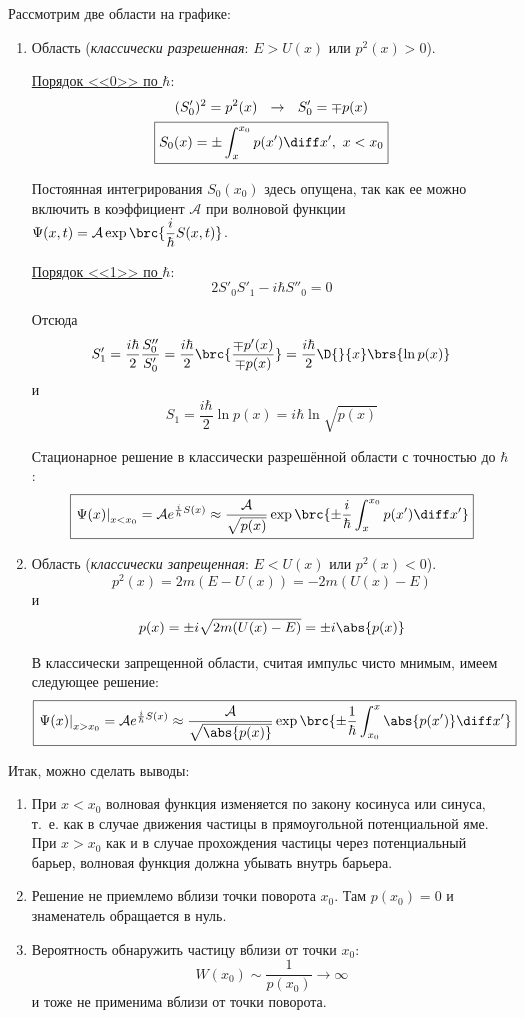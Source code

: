 Рассмотрим две области на графике:
\renewcommand{\labelenumi}{(\alph{enumi})}
\begin{enumerate}
\item Область  ({\em классически разрешенная}: $E > U(x)$ или $p^2(x)>0$).

\underline{Порядок <<0>> по $\hbar$}:
$$
\begin{gathered}
(S'_0)^2 = p^2(x) ~~ \rightarrow~~ S'_0 = \mp p(x)\\
\boxed{S_0(x) = \pm \int_x^{x_0} p(x')\diff x',~ x<x_0}
\end{gathered}
$$

Постоянная интегрирования $S_0(x_0)$ здесь опущена, так как ее можно включить в коэффициент $\mathcal{A}$ при волновой функции ${\Psi(x, t) = \mathcal{A} \exp \brc{\dfrac{i}{\hbar} S(x, t)}}$.

\underline{Порядок <<1>> по $\hbar$}:
$$
2 S'_0 S'_1 - i\hbar S''_0 = 0
$$

Отсюда
$$
S'_1 = \frac{i\hbar}{2} \frac{S''_0}{S'_0} = \frac{i\hbar}{2} \brc{\frac{\mp p'(x)}{\mp p(x)}} = \frac{i\hbar}{2} \D{}{x}\brs{\ln p(x)}
$$
и
$$
S_1 = \frac{i\hbar}{2} \ln p(x) = \boxed{i\hbar \ln \sqrt{p(x)}}
$$

Стационарное решение в классически разрешённой области с точностью до $\hbar$:
$$
\boxed{\left. \Psi(x) \right|_{x<x_0} = \mathcal{A} e^{\frac{i}{h} S(x)} \approx \frac{\mathcal{A}}{\sqrt{p(x)}} \exp \brc{\pm\frac{i}{\hbar}\int_x^{x_0} p(x') \diff x'} }
$$

\item Область  ({\em классически запрещенная}: $E<U(x)$ или $p^2(x)<0$).
$$
p^2(x) = 2m(E-U(x)) = -2m(U(x)-E)
$$
и
$$
p(x) = \pm i \sqrt{2m(U(x)-E)} = \pm i \abs{p(x)}
$$

В классически запрещенной области, считая импульс чисто мнимым, имеем следующее решение:
$$
\boxed{\left. \Psi(x) \right|_{x>x_0} = \mathcal{A} e^{\frac{i}{\hbar} S(x)} \approx \frac{\mathcal{A}}{\sqrt{\abs{p(x)}}} \exp \brc{\pm\frac{1}{\hbar}\int_{x_0}^{x} \abs{p(x')} \diff x'} }
$$
\end{enumerate}

Итак, можно сделать выводы:
\renewcommand{\labelenumi}{\arabic{enumi})}
\begin{enumerate}
\item При $x<x_0$ волновая функция изменяется по закону косинуса или синуса, т.~е. как в случае движения частицы в прямоугольной потенциальной яме. При $x>x_0$ как и в случае прохождения частицы через потенциальный барьер, волновая функция должна убывать внутрь барьера.
\item Решение не приемлемо вблизи точки поворота $x_0$. Там $p(x_0) = 0$ и знаменатель обращается в нуль.
\item Вероятность обнаружить частицу вблизи от точки $x_0$:
$${W(x_0) \sim \dfrac{1}{p(x_0)} \to \infty}$$
и тоже не применима вблизи от точки поворота.
\end{enumerate}

